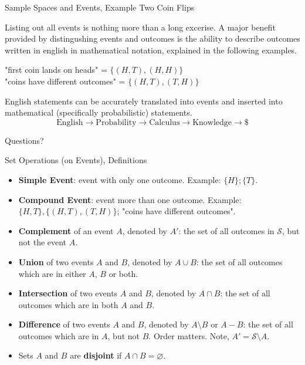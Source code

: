\documentclass{beamer}
\newcommand{\qtns}[0]{\begin{center} Questions? \end{center}}
\newcommand{\nl}[1]{\vspace{#1 em}}
\let\emptyset\varnothing
\newcommand{\SampS}[0]{$\mathcal{S}$}
\begin{document}
\begin{frame}{Sample Spaces and Events, Example Two Coin Flips}

    Listing out all events is nothing more than a long excerise.  A major benefit provided by distingushing events and outcomes is the ability to describe outcomes written in english in mathematical notation, explained in the following examples.\\
    \begin{center}
        "first coin lands on heads" = $\{(H,T),(H,H)\}$\\
        \nl{0.5}
        "coins have different outcomes" = $\{(H,T),(T,H)\}$
    \end{center}
    English statements can be accurately translated into events and inserted into mathematical  (specifically probabilistic) statements.
    \[\text{English} \rightarrow \text{Probability} \rightarrow \text{Calculus} \rightarrow \text{Knowledge} \rightarrow \$\]
    \qtns
\end{frame}

\begin{frame}{Set Operations (on Events), Definitions}

    \begin{itemize}
        \item {\bf Simple Event}: event with only one outcome. Example: $\{H\};\{T\}$.
        \item {\bf Compound Event}: event more than one outcome. Example: $\{H,T\},\{(H,T),(T,H)\}$; "coins have different outcomes".
        \item {\bf Complement} of an event $A$, denoted by $A'$: the set of all outcomes in \SampS, but not the event $A$.
        \item {\bf Union} of two events $A$ and $B$, denoted by $A\cup B$: the set of all outcomes which are in either $A$, $B$ or both.
        \item {\bf Intersection} of two events $A$ and $B$, denoted by $A\cap B$: the set of all outcomes which are in both $A$ and $B$.
        \item {\bf Difference} of two events $A$ and $B$, denoted by $A\setminus B$ or $A-B$: the set of all outcomes which are in $A$, but not $B$. Order matters. Note, $A' = \mathcal{S}\setminus A$.
        \item Sets $A$ and $B$ are {\bf disjoint} if $A\cap B = \emptyset$.
    \end{itemize}
\end{frame}
\end{document}
